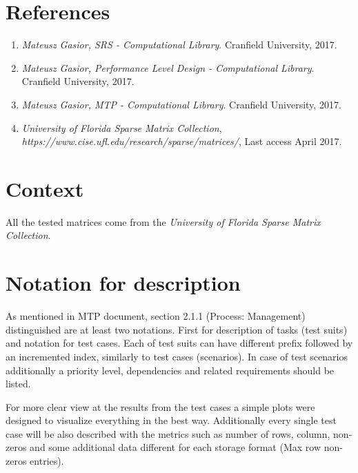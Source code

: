\section{References} \label{s:introduction:references}
	\begin{comment}
		List all of the applicable reference documents. The references are separated into “external” references
		that are imposed external to the project and “internal” references that are imposed from within to the
		project. This may also be at the end of the document.
	\end{comment}
	\begin{enumerate}
		\item \emph{Mateusz Gasior, \gls{SRS} - Computational Library}. Cranfield University, 2017.
		\item \emph{Mateusz Gasior, Performance Level Design - Computational Library}. Cranfield University, 2017.
		\item \emph{Mateusz Gasior, \gls{MTP} - Computational Library}. Cranfield University, 2017.
		\item \emph{University of Florida Sparse Matrix Collection}, \textit{https://www.cise.ufl.edu/research/sparse/matrices/}, Last access April 2017.
	\end{enumerate}
\section{Context} \label{s:introduction:context}
	\begin{comment}
		Provide any required context that is not already covered by other sections of this document (e.g., thirdparty
		testing via the Internet).
	\end{comment}
	All the tested matrices come from the \emph{University of Florida Sparse Matrix Collection}.
\section{Notation for description} \label{s:introduction:notation-for-description}
	\begin{comment}
		Define any numbering schemes, e.g., for scenarios and test cases. The intent of this section is to
		explain any such schema.
	\end{comment}
	As mentioned in \gls{MTP} document, section 2.1.1 (Process: Management) distinguished are at least two notations. First for description of tasks (test suits) and notation for test cases. Each of test suits can have different prefix followed by an incremented index, similarly to test cases (scenarios). In case of test scenarios additionally a priority level, dependencies and related requirements should be listed.
	
	For more clear view at the results from the test cases a simple plots were designed to visualize everything in the best way. Additionally every single test case will be also described with the metrics such as number of rows, column, non-zeros and some additional data different for each storage format (Max row non-zeros entries).
	